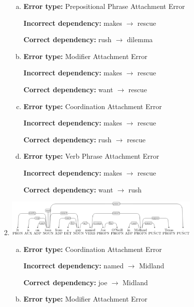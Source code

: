 \begin{enumerate}[1.]
\begin{enumerate}[(a)]
\item {\bf Error type:} Prepositional Phrase Attachment Error

{\bf Incorrect dependency:} makes $\rightarrow$ rescue 

{\bf Correct dependency:} rush $\rightarrow$ dilemma

\item {\bf Error type:} Modifier Attachment Error

{\bf Incorrect dependency:} makes $\rightarrow$ rescue

{\bf Correct dependency:} want $\rightarrow$ rescue

\item {\bf Error type:} Coordination Attachment Error 

{\bf Incorrect dependency:} makes $\rightarrow$ rescue 

{\bf Correct dependency:} rush $\rightarrow$ rescue

\item {\bf Error type:} Verb Phrase Attachment Error

{\bf Incorrect dependency:} makes $\rightarrow$ rescue

{\bf Correct dependency:} want $\rightarrow$ rush

\end{enumerate}


\item {}

\begin{center}
\includegraphics[width=0.75\textwidth]{8-1.png}
\end{center}

\begin{enumerate}[(a)]
\item {\bf Error type:} Coordination Attachment Error

{\bf Incorrect dependency:} named $\rightarrow$ Midland 

{\bf Correct dependency:} joe $\rightarrow$ Midland

\item {\bf Error type:} Modifier Attachment Error


\end{enumerate}
\end{enumerate}
